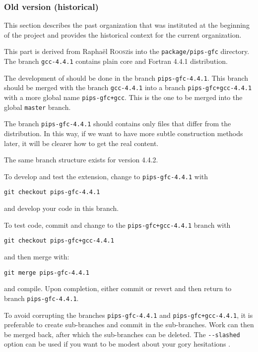 \documentclass[a4paper]{article}
\begin{document}
\subsubsection{Old version (historical)}
\label{sec:old-version}


This section describes the past organization that was instituted at
the beginning of the project and provides the historical context for
the current organization.

This part is derived from Raphaël \textsc{Roosz}is into the
\texttt{package/pips-gfc}
directory. The branch \texttt{gcc-4.4.1} contains plain \Agcc core and Fortran 4.4.1 distribution.

The development of \Apipsgfc should be done in the branch
\texttt{pips-gfc-4.4.1}. This branch should be merged with the
branch \texttt{gcc-4.4.1} into a branch \texttt{pips-gfc+gcc-4.4.1} with a
more global name \texttt{pips-gfc+gcc}. This is the one to be merged
into the global \texttt{master} branch.

The branch \texttt{pips-gfc-4.4.1} should contains only files that differ from
the \Agcc distribution. In this way, if we want to have more subtle
construction methods later, it will be clearer how to get the real
content.

The same branch structure exists for version 4.4.2.

To develop and test the \Apipsgfc extension, change to
\texttt{pips-gfc-4.4.1} with
\begin{verbatim}
git checkout pips-gfc-4.4.1
\end{verbatim}
and develop your code in this branch.

To test code, commit and change to the \texttt{pips-gfc+gcc-4.4.1} branch with
\begin{verbatim}
git checkout pips-gfc+gcc-4.4.1
\end{verbatim}
and then merge with:
\begin{verbatim}
git merge pips-gfc-4.4.1
\end{verbatim}
and compile. Upon completion, either commit or revert and then return
to branch \texttt{pips-gfc-4.4.1}.

To avoid corrupting the branches \texttt{pips-gfc-4.4.1} and
\texttt{pips-gfc+gcc-4.4.1}, it is preferable to create sub-branches
and commit in the sub-branches. Work can then be merged
back, after which the sub-branches can be deleted. The
\verb|--slashed| option can be used
if you want to be modest about your gory hesitations \smiley{}.
\end{document}
